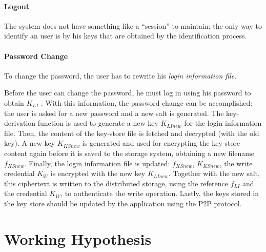 \documentclass[12pt,spanish]{article}
\begin{document}
\paragraph{Logout}
The system does not have something like a ``session'' to maintain; the only way
to identify an user is by his keys that are obtained by the identification
process.


\paragraph{Password Change}
To change the password, the user has to rewrite his \textit{login information
file}.

Before the user can change the password, he must log in using his password to
obtain $K_{LI}$ . With this information, the password change can be accomplished:
the user is asked for a new password and a new salt is
generated. The key-derivation function is used to generate a new key
$K_{LInew}$
for the login information file. Then, the content of the key-store file is
fetched and decrypted (with the old key). A new key $K_{KSnew}$ is generated and
used for encrypting the key-store content again before it is saved to the
storage system, obtaining a new filename $f_{KSnew}$.
Finally, the login information file
is updated: $f_{KSnew}$, $K_{KSnew}$, the write credential $K_W$ %
is encrypted with the new key $K_{LInew}$.
  Together with the new salt, this ciphertext is written to the distributed
storage, using the reference $f_{LI}$ and the credential $K_W$, to authenticate the
write operation. Lastly, the keys stored in the key store should be updated by
the application using the P2P protocol.




\vfill

\section{Working Hypothesis}
\end{document}
